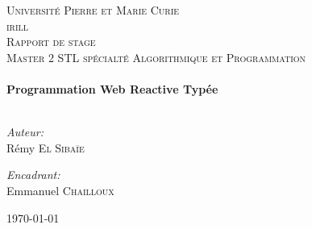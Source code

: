 
\begin{titlepage}

\begin{center}



\textsc{\LARGE Université Pierre et Marie Curie}\\
\textsc{\LARGE irill}\\[1.5cm]

\textsc{\Large Rapport de stage}\\[0.5cm]

\textsc{\Large Master 2 STL spécialté Algorithmique et Programmation}\\[0.5cm]

\HRule \\[0.4cm]
{ \huge \bfseries Programmation Web Reactive Typée}\\[0.4cm]

\HRule \\[1.5cm]

\begin{minipage}{0.4\textwidth}
\begin{flushleft} \large
\emph{Auteur:}\\
Rémy \textsc{El Sibaïe}
\end{flushleft}
\end{minipage}
\begin{minipage}{0.4\textwidth}
\begin{flushright} \large
\emph{Encadrant:} \\
Emmanuel \textsc{Chailloux}
\end{flushright}
\end{minipage}

\vfill

{\large \today}

\end{center}

\end{titlepage}
